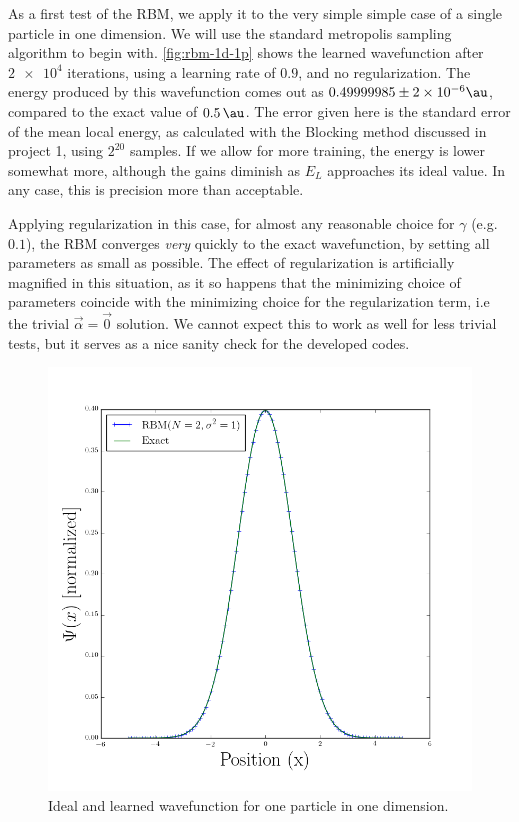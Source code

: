 \documentclass[a4paper, 11pt]{article}
\begin{document}
\begin{multicols}{2}
    As a first test of the RBM, we apply it to the very simple simple case of a
    single particle in one dimension. We will use the standard metropolis
    sampling algorithm to begin with. \autoref{fig:rbm-1d-1p} shows the learned
    wavefunction after $\num{2e4}$ iterations, using a learning rate of $0.9$,
    and no regularization. The energy produced by this wavefunction comes out as
    $0.49999985\pm \num{2e-6}\si{\au}$, compared to the exact value of
    $\SI{0.5}{\au}$. The error given here is the standard error of the mean
    local energy, as calculated with the Blocking method discussed in project 1,
    using $2^{20}$ samples. If we allow for more training, the energy is lower
    somewhat more, although the gains diminish as $E_L$ approaches its ideal
    value. In any case, this is precision more than acceptable.

    Applying regularization in this case, for almost any reasonable choice for
    $\gamma$ (e.g. $0.1$), the RBM converges \emph{very} quickly to the exact
    wavefunction, by setting all parameters as small as possible. The effect of
    regularization is artificially magnified in this situation, as it so happens
    that the minimizing choice of parameters coincide with the minimizing choice
    for the regularization term, i.e the trivial $\vec\alpha=\vec 0$ solution.
    We cannot expect this to work as well for less trivial tests, but it serves
    as a nice sanity check for the developed codes.


\end{multicols}

\begin{figure}[ht]
    \centering
    \includegraphics[width=0.8\linewidth]{../results/rbm-1d-1p.png}
    \caption{Ideal and learned wavefunction for one particle in one dimension.}
    \label{fig:rbm-1d-1p}
\end{figure}
\end{document}
